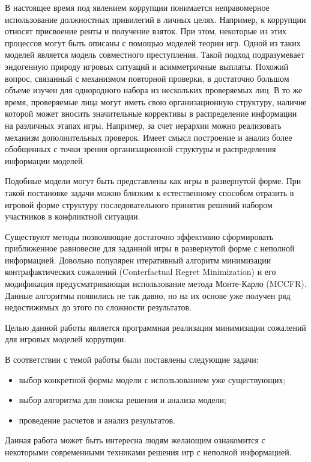 \Introduction

\par
В настоящее время под явлением коррупции понимается неправомерное использование должностных привилегий в личных целях. Например, к коррупции относят присвоение ренты и получение взяток. При этом, некоторые из этих процессов могут быть описаны с помощью моделей теории игр. Одной из таких моделей является модель совместного преступления\cite{Spengler}. Такой подход подразумевает эндогенную природу игровых ситуаций и асимметричные выплаты. Похожий вопрос, связанный с механизмом повторной проверки, в достаточно большом объеме изучен для однородного набора из нескольких проверяемых лиц\cite{Kumacheva}. В то же время, проверяемые лица могут иметь свою организационную структуру, наличие которой может вносить значительные коррективы в распределение информации на различных этапах игры. Например, за счет иерархии можно реализовать механизм дополнительных проверок\cite{Orlov}. Имеет смысл построение и анализ более обобщенных с точки зрения организационной структуры и распределения информации моделей.
\par
Подобные модели могут быть представлены как игры в развернутой форме. При такой постановке задачи можно близким к естественному способом отразить в игровой форме структуру последовательного принятия решений набором участников в конфликтной ситуации.
\par
Существуют методы позволяющие достаточно эффективно сформировать приближенное равновесие для заданной игры в развернутой форме с неполной информацией. Довольно популярен итеративный алгоритм минимизации контрафактических сожалений (Conterfactual Regret Minimization)\cite{NIPS07cfr} и его модификация предусматривающая использование метода Монте-Карло (MCCFR)\cite{MCCFR}.  Данные алгоритмы появились не так давно, но на их основе уже получен ряд недостижимых до этого по сложности результатов.
\par
Целью данной работы является программная реализация минимизации сожалений для игровых моделей коррупции.
\par
В соответствии с темой работы были поставлены следующие задачи:
\begin{itemize}
	\item выбор конкретной формы модели с использованием уже существующих;
	\item выбор алгоритма для поиска решения и анализа модели;
	\item проведение расчетов и анализ результатов.
\end{itemize}
\par
Данная работа может быть интересна людям желающим ознакомится с некоторыми современными техниками решения игр с неполной информацией.
